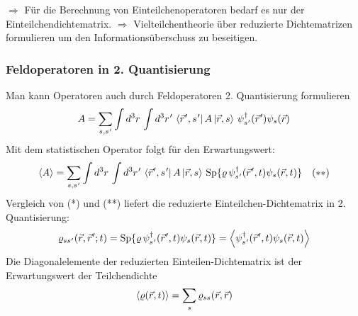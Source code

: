 $\Rightarrow$ Für die Berechnung von Einteilchenoperatoren bedarf es nur der Einteilchendichtematrix.
$\Rightarrow$ Vielteilchentheorie über reduzierte Dichtematrizen formulieren um den Informationsüberschuss zu beseitigen.

\subsubsection*{Feldoperatoren in 2. Quantisierung}
Man kann Operatoren auch durch Feldoperatoren 2. Quantisierung formulieren
\begin{equation}
  A = \sum_{s,s\mkern1mu'}\int d^3r \,\int d^3r\mkern1mu'  \,
  \left\langle\vec{r}\mkern1mu',s\mkern1mu'\right| A \left|\vec{r},s\right\rangle \, \psi^\dagger_{s\mkern1mu'}(\vec{r}\mkern1mu') \psi_s(\vec{r})
\end{equation}
Mit dem statistischen Operator folgt für den Erwartungswert:
\begin{equation}
  \left\langle A\right\rangle = \sum_{s,s\mkern1mu'}
  \int d^3r \, \int d^3r\mkern1mu'\,
  \left\langle\vec{r}\mkern1mu',s\mkern1mu'\right| A \left|\vec{r},s\right\rangle \,
  \mathrm{Sp}\{\varrho \, \psi^\dagger_{s\mkern1mu'}(\vec{r}\mkern1mu',t)\psi_s(\vec{r},t)\} \quad (**)
\end{equation}
Vergleich von (*) und (**) liefert die reduzierte Einteilchen-Dichtematrix in 2. Quantisierung:
\begin{equation}
  \varrho_{ss\mkern1mu'}(\vec{r},\vec{r}\mkern1mu';t) =
  \mathrm{Sp}\{\varrho \, \psi^\dagger_{s\mkern1mu'}(\vec{r}\mkern1mu',t)\psi_s(\vec{r},t)\}
  = \left\langle\psi^\dagger_{s\mkern1mu'}(\vec{r}\mkern1mu',t)\psi_s(\vec{r},t)\right\rangle
\end{equation}
Die Diagonalelemente der reduzierten Einteilen-Dichtematrix ist der Erwartungswert der Teilchendichte
\begin{equation}
  \left\langle\varrho(\vec{r},t)\right\rangle = \sum _ s \varrho_{ss}(\vec{r},\vec{r})
\end{equation}


